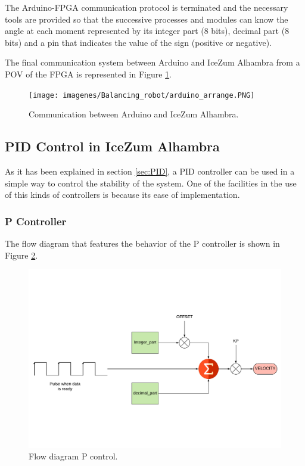 The Arduino-FPGA communication protocol is terminated and the necessary tools are provided so that the successive processes and modules can know the angle at each moment represented by its integer part (8 bits), decimal part (8 bits) and a pin that indicates the value of the sign (positive or negative).

The final communication system between Arduino and IceZum Alhambra from a POV of the FPGA is represented in Figure \ref{fig:arduino_arrange}.

\begin{figure}[H]
	\center
	\texttt{[image: imagenes/Balancing\_robot/arduino\_arrange.PNG]}
	\caption{Communication between Arduino and IceZum Alhambra.}
	\label{fig:arduino_arrange}
\end{figure}


\newpage

\subsection{PID Control in IceZum Alhambra}
As it has been explained in section \ref{sec:PID}, a PID controller can be used in a simple way to control the stability of the system. \newline
One of the facilities in the use of this kinds of controllers is because its ease of implementation.
\subsubsection{P Controller} \label{sec:ControladorP}
The flow diagram that features the behavior of the P controller is shown in Figure \ref{fig:P_control}.
	\begin{figure}[H]
	\center
	\includegraphics[trim = 0cm 4cm 0mm 4cm, clip,scale=0.4]{imagenes/Balancing_robot/P.pdf}
	\caption{Flow diagram P control.}
	\label{fig:P_control}
\end{figure}

